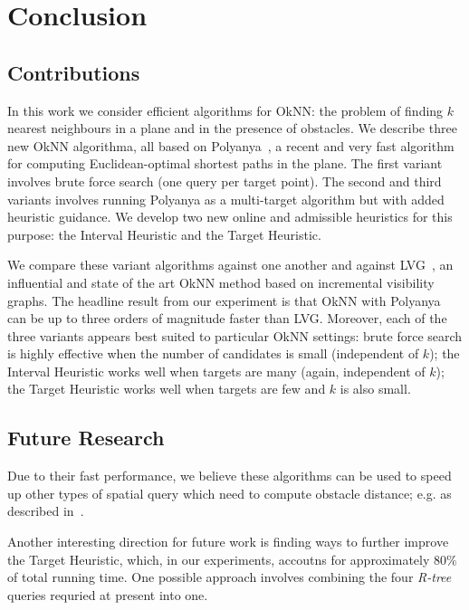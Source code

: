 \chapter{Conclusion}
\section{Contributions} \label{conc}
In this work we consider efficient algorithms for OkNN: the problem of finding $k$ nearest neighbours in a plane and in the presence of obstacles. We describe three new OkNN algorithma, all based on Polyanya~\cite{cuicompromise}, a recent and very fast algorithm for computing Euclidean-optimal shortest paths in the plane. The first variant involves brute force search (one query per target point). The second and third variants involves running Polyanya as a multi-target algorithm but with added heuristic guidance. We develop two new online and admissible heuristics for this purpose: the Interval Heuristic and the Target Heuristic.

We compare these variant algorithms against one another and against LVG~\cite{zhang2004spatial}, an influential and state of the art OkNN method based on incremental visibility graphs. The headline result from our experiment is that OkNN with Polyanya can be up to three orders of magnitude faster than LVG. Moreover, each of the three variants appears best suited to particular
OkNN settings: brute force search is highly effective when the number of candidates is small (independent of $k$); the Interval Heuristic works well when targets are many (again, independent of $k$); the Target Heuristic works well when targets are few and $k$ is also small.

\section{Future Research}
Due to their fast performance, we believe these algorithms can be used to speed up other types of spatial query which need to compute obstacle distance; e.g. as described in~\cite{gao2016reverse,gao2009continuous}.

Another interesting direction for future work is finding ways to further improve the Target Heuristic, which, in our experiments, accoutns for approximately $80\%$ of total running time. One possible approach involves combining the four \textit{R-tree} queries requried at present into one.

